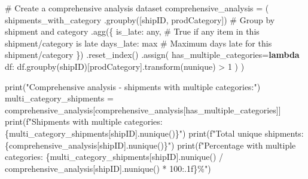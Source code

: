 \documentclass[
  letterpaper,
  DIV=11,
  numbers=noendperiod]{scrartcl}
\newenvironment{Shaded}{\begin{snugshade}}{\end{snugshade}}
\newcommand{\BuiltInTok}[1]{\textcolor[rgb]{0.00,0.23,0.31}{#1}}
\newcommand{\CommentTok}[1]{\textcolor[rgb]{0.37,0.37,0.37}{#1}}
\newcommand{\DecValTok}[1]{\textcolor[rgb]{0.68,0.00,0.00}{#1}}
\newcommand{\KeywordTok}[1]{\textcolor[rgb]{0.00,0.23,0.31}{\textbf{#1}}}
\newcommand{\NormalTok}[1]{\textcolor[rgb]{0.00,0.23,0.31}{#1}}
\newcommand{\OperatorTok}[1]{\textcolor[rgb]{0.37,0.37,0.37}{#1}}
\newcommand{\SpecialCharTok}[1]{\textcolor[rgb]{0.37,0.37,0.37}{#1}}
\newcommand{\SpecialStringTok}[1]{\textcolor[rgb]{0.13,0.47,0.30}{#1}}
\newcommand{\StringTok}[1]{\textcolor[rgb]{0.13,0.47,0.30}{#1}}
\begin{document}
\label{mental-model-7-comprehensive}
\begin{Shaded}
\begin{Highlighting}[]
\CommentTok{\# Create a comprehensive analysis dataset}
\NormalTok{comprehensive\_analysis }\OperatorTok{=}\NormalTok{ (}
\NormalTok{    shipments\_with\_category}
\NormalTok{    .groupby([}\StringTok{\textquotesingle{}shipID\textquotesingle{}}\NormalTok{, }\StringTok{\textquotesingle{}prodCategory\textquotesingle{}}\NormalTok{])  }\CommentTok{\# Group by shipment and category}
\NormalTok{    .agg(\{}
        \StringTok{\textquotesingle{}is\_late\textquotesingle{}}\NormalTok{: }\StringTok{\textquotesingle{}any\textquotesingle{}}\NormalTok{,  }\CommentTok{\# True if any item in this shipment/category is late}
        \StringTok{\textquotesingle{}days\_late\textquotesingle{}}\NormalTok{: }\StringTok{\textquotesingle{}max\textquotesingle{}}  \CommentTok{\# Maximum days late for this shipment/category}
\NormalTok{    \})}
\NormalTok{    .reset\_index()}
\NormalTok{    .assign(}
\NormalTok{        has\_multiple\_categories}\OperatorTok{=}\KeywordTok{lambda}\NormalTok{ df: df.groupby(}\StringTok{\textquotesingle{}shipID\textquotesingle{}}\NormalTok{)[}\StringTok{\textquotesingle{}prodCategory\textquotesingle{}}\NormalTok{].transform(}\StringTok{\textquotesingle{}nunique\textquotesingle{}}\NormalTok{) }\OperatorTok{\textgreater{}} \DecValTok{1}
\NormalTok{    )}
\NormalTok{)}

\BuiltInTok{print}\NormalTok{(}\StringTok{"Comprehensive analysis {-} shipments with multiple categories:"}\NormalTok{)}
\NormalTok{multi\_category\_shipments }\OperatorTok{=}\NormalTok{ comprehensive\_analysis[comprehensive\_analysis[}\StringTok{\textquotesingle{}has\_multiple\_categories\textquotesingle{}}\NormalTok{]]}
\BuiltInTok{print}\NormalTok{(}\SpecialStringTok{f"Shipments with multiple categories: }\SpecialCharTok{\{}\NormalTok{multi\_category\_shipments[}\StringTok{\textquotesingle{}shipID\textquotesingle{}}\NormalTok{]}\SpecialCharTok{.}\NormalTok{nunique()}\SpecialCharTok{\}}\SpecialStringTok{"}\NormalTok{)}
\BuiltInTok{print}\NormalTok{(}\SpecialStringTok{f"Total unique shipments: }\SpecialCharTok{\{}\NormalTok{comprehensive\_analysis[}\StringTok{\textquotesingle{}shipID\textquotesingle{}}\NormalTok{]}\SpecialCharTok{.}\NormalTok{nunique()}\SpecialCharTok{\}}\SpecialStringTok{"}\NormalTok{)}
\BuiltInTok{print}\NormalTok{(}\SpecialStringTok{f"Percentage with multiple categories: }\SpecialCharTok{\{}\NormalTok{multi\_category\_shipments[}\StringTok{\textquotesingle{}shipID\textquotesingle{}}\NormalTok{]}\SpecialCharTok{.}\NormalTok{nunique() }\OperatorTok{/}\NormalTok{ comprehensive\_analysis[}\StringTok{\textquotesingle{}shipID\textquotesingle{}}\NormalTok{]}\SpecialCharTok{.}\NormalTok{nunique() }\OperatorTok{*} \DecValTok{100}\SpecialCharTok{:.1f\}}\SpecialStringTok{\%"}\NormalTok{)}
\end{Highlighting}
\end{Shaded}
\end{document}

